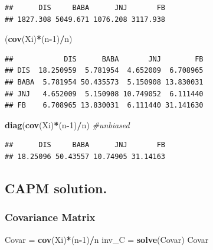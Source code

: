 \documentclass[]{article}
\newenvironment{Shaded}{\begin{snugshade}}{\end{snugshade}}
\newcommand{\KeywordTok}[1]{\textcolor[rgb]{0.13,0.29,0.53}{\textbf{#1}}}
\newcommand{\DecValTok}[1]{\textcolor[rgb]{0.00,0.00,0.81}{#1}}
\newcommand{\StringTok}[1]{\textcolor[rgb]{0.31,0.60,0.02}{#1}}
\newcommand{\CommentTok}[1]{\textcolor[rgb]{0.56,0.35,0.01}{\textit{#1}}}
\newcommand{\OperatorTok}[1]{\textcolor[rgb]{0.81,0.36,0.00}{\textbf{#1}}}
\newcommand{\NormalTok}[1]{#1}
\begin{document}
\begin{verbatim}
##      DIS     BABA      JNJ       FB 
## 1827.308 5049.671 1076.208 3117.938
\end{verbatim}

\begin{Shaded}
\begin{Highlighting}[]
\NormalTok{(}\KeywordTok{cov}\NormalTok{(Xi)}\OperatorTok{*}\NormalTok{(n}\OperatorTok{-}\DecValTok{1}\NormalTok{)}\OperatorTok{/}\NormalTok{n)}
\end{Highlighting}
\end{Shaded}

\begin{verbatim}
##            DIS      BABA       JNJ        FB
## DIS  18.250959  5.781954  4.652009  6.708965
## BABA  5.781954 50.435573  5.150908 13.830031
## JNJ   4.652009  5.150908 10.749052  6.111440
## FB    6.708965 13.830031  6.111440 31.141630
\end{verbatim}

\begin{Shaded}
\begin{Highlighting}[]
\KeywordTok{diag}\NormalTok{(}\KeywordTok{cov}\NormalTok{(Xi)}\OperatorTok{*}\NormalTok{(n}\OperatorTok{-}\DecValTok{1}\NormalTok{)}\OperatorTok{/}\NormalTok{n) }\CommentTok{#unbiased}
\end{Highlighting}
\end{Shaded}

\begin{verbatim}
##      DIS     BABA      JNJ       FB 
## 18.25096 50.43557 10.74905 31.14163
\end{verbatim}

\subsection{CAPM solution.}\label{capm-solution.}

\subsubsection{Covariance Matrix}\label{covariance-matrix-1}

\begin{Shaded}
\begin{Highlighting}[]
\NormalTok{Covar =}\StringTok{ }\KeywordTok{cov}\NormalTok{(Xi)}\OperatorTok{*}\NormalTok{(n}\OperatorTok{-}\DecValTok{1}\NormalTok{)}\OperatorTok{/}\NormalTok{n}
\NormalTok{inv_C =}\StringTok{ }\KeywordTok{solve}\NormalTok{(Covar)}
\NormalTok{Covar}
\end{Highlighting}
\end{Shaded}
\end{document}
